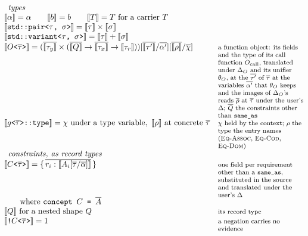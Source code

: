 \begin{figure}[htbp]
\[
\begin{array}{@{}l@{\quad}l@{}}
\multicolumn{2}{l}{\textit{types}} \\
\llbracket \alpha \rrbracket = \alpha \qquad \llbracket b \rrbracket = b \qquad \llbracket T \rrbracket = T \text{ for a carrier } T & \\
\llbracket \texttt{std::pair<}\tau\texttt{, }\sigma\texttt{>} \rrbracket = \llbracket \tau \rrbracket \times \llbracket \sigma \rrbracket & \\
\llbracket \texttt{std::variant<}\tau\texttt{, }\sigma\texttt{>} \rrbracket = \llbracket \tau \rrbracket + \llbracket \sigma \rrbracket & \\
\llbracket O\texttt{<}\overline{\tau}\texttt{>} \rrbracket = (\overline{\llbracket \tau_y \rrbracket} \times (\overline{\llbracket Q \rrbracket} \to \overline{\llbracket \tau_x \rrbracket} \to \llbracket \tau_r \rrbracket))[\overline{\llbracket \tau' \rrbracket}/\overline{\alpha'}][\overline{\llbracket \rho \rrbracket}/\overline{\chi}] & \note{a function object: its fields and the type of its call function $O_{\mathrm{call}}$, translated under $\Delta_O$ and its unifier $\theta_O$, at the $\overline{\tau'}$ of $\overline{\tau}$ at the variables $\overline{\alpha'}$ that $\theta_O$ keeps and the images of $\Delta_O$'s reads $\overline{\rho}$ at $\overline{\tau}$ under the user's $\Delta$; $\overline{Q}$ the constraints other than \texttt{same\_as}} \\
\llbracket g\texttt{<}\overline{\tau}\texttt{>::type} \rrbracket = \chi \text{ under a type variable}, \ \llbracket \rho \rrbracket \text{ at concrete } \overline{\tau} & \note{$\chi$ held by the context; $\rho$ the type the entry names (\textsc{Eq-Assoc}, \textsc{Eq-Cod}, \textsc{Eq-Dom})} \\[6pt]
\multicolumn{2}{l}{\textit{constraints, as record types}} \\
\llbracket C\texttt{<}\overline{\tau}\texttt{>} \rrbracket = \{\,\overline{r_i : \llbracket A_i[\overline{\tau}/\overline{\alpha}] \rrbracket}\,\} & \note{one field per requirement other than a \texttt{same\_as}, substituted in the source and translated under the user's $\Delta$} \\
\qquad \text{where } \texttt{concept } C \texttt{ = } \overline{A} & \\
\llbracket Q \rrbracket \text{ for a nested shape } Q & \note{its record type} \\
\llbracket \texttt{!}C\texttt{<}\overline{\tau}\texttt{>} \rrbracket = 1 & \note{a negation carries no evidence} \\

\end{array}\]
\end{figure}

